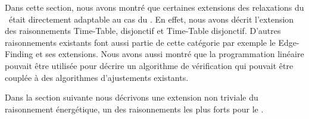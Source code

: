 Dans cette section, nous avons montré que certaines extensions des
relaxations du \CUSP~était directement adaptable au cas du \CECSP. En
effet, nous avons décrit l'extension des raisonnements Time-Table,
disjonctif et Time-Table disjonctif. D'autres raisonnements existants
font aussi partie de cette catégorie par exemple le Edge-Finding et
ses extensions. Nous avons aussi montré que la programmation linéaire
pouvait être utilisée pour décrire un algorithme de vérification qui
pouvait être couplée à des algorithmes d'ajustements existants.

Dans la section suivante nous décrivons une extension non triviale du
raisonnement énergétique, un des raisonnements les plus forts pour le \CUSP.